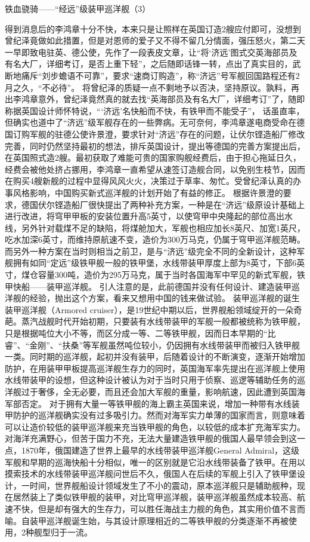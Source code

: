 \documentclass[12pt,UTF8]{ctexbook}
\begin{document}
铁血骁骑——“经远”级装甲巡洋舰（3）

得到消息后的李鸿章十分不快，本来只是让照样在英国订造2艘应付即可，没想到曾纪泽竟做如此措置，但是对恩师的爱子又不得不留几分情面，强压怒火，第二天一早即致电驻英、德公使，先作了一段表皮文章，让“将‘济远’图式交英海部员及有名大厂，详细考订，是否上重下轻”，之后随即话锋一转，点出了真实目的，武断地痛斥“刘步蟾语不可靠”，要求“速商订购造”，称“济远”号军舰回国路程还有2月之久，“不必待”。 将曾纪泽的质疑一点不剩地予以否决，坚持原议。孰料，再出李鸿章意外，曾纪泽竟然真的就去找“英海部员及有名大厂，详细考订”了，随即称据英国设计师怀特说，“‘济远’名快船而不快，有铁甲而不能受子”， 话虽直率，但确实也道中了“济远”级军舰存在的一些弊病。无可奈何，李鸿章遂电商受命在德国订购军舰的驻德公使许景澄，要求针对“济远”存在的问题，让伏尔铿造船厂修改完善，同时仍然坚持最初的想法，排斥英国设计，提出等德国的完善方案提出后，在英国照式造2艘。最初获取了难能可贵的国家购舰经费后，由于担心拖延日久，经费会被他处挤占挪用，李鸿章一直希望从速签订造舰合同，以免别生枝节，因而在购买4艘新舰的过程中显得风风火火，决策过于草率、匆忙。受曾纪泽认真的办事风格影响，中国购买新式巡洋舰的计划开始了有益的修正。
根据许景澄的要求，德国伏尔铿造船厂很快提出了两种补充方案，一种是在“济远”级原设计基础上进行改进，将穹甲甲板的安装位置升高5英寸，以使穹甲中央隆起的部位高出水线，另外针对载煤不足的缺陷，将煤舱加大，军舰也相应加长8英尺、加宽1英尺，吃水加深6英寸，而维持原航速不变，造价为300万马克，仍属于穹甲巡洋舰范畴。而另外一种方案在当时则相当之前卫，是与“济远”级完全不同的全新设计，这种军舰拥有如同“定远”级铁甲舰一般的铁甲堡，水线带装甲厚度上部为8英寸，下部6英寸，煤仓容量300吨，造价为295万马克，属于当时各国海军中罕见的新式军舰，铁甲快船——装甲巡洋舰。 引人注意的是，此前德国并没有任何设计、建造装甲巡洋舰的经验，抛出这个方案，看来又想用中国的钱来做试验。
装甲巡洋舰的诞生
装甲巡洋舰（Armored cruiser），是19世纪中期以后，世界舰船领域绽开的一朵奇葩。蒸汽战舰时代开始初期，只要装有水线带装甲的军舰一般都被统称为铁甲舰，只是根据吨位大小不等，而区分成一等、二等铁甲舰，因而日本早期的“比睿”、“金刚”、“扶桑”等军舰虽然吨位较小，仍因拥有水线带装甲而被归入铁甲舰一类。同时期的巡洋舰，起初并没有装甲，后随着设计的不断演变，逐渐开始增加防护，在用装甲甲板提高巡洋舰生存力的同时，英国海军率先提出在巡洋舰上使用水线带装甲的设想，但这种设计被认为对于当时只用于侦察、巡逻等辅助任务的巡洋舰过于奢侈，全无必要，而且还会加大军舰的重量，影响航速，因此遭到英国海军部否定。
对于拥有大量一等铁甲舰的海上霸主英国来说，增加一种带有水线装甲防护的巡洋舰确实没有过多吸引力。然而对海军实力单薄的国家而言，则意味着可以让造价较低的装甲巡洋舰来充当铁甲舰的角色，以较低的成本扩充海军实力。对海洋充满野心，但苦于国力不充，无法大量建造铁甲舰的俄国人最早领会到这一点，1870年，俄国建造了世界上最早的水线带装甲巡洋舰General Admiral，这级军舰和早期的巡海快船十分相似，唯一的区别就是它沿水线带装备了铁甲。在用以摸索技术的水线带装甲巡洋舰问世后不久，俄国人在后续的军舰上引入了铁甲堡设计，一时间，世界舰船设计领域发生了不小的震动，原本巡洋舰只是辅助舰种，现在居然装上了类似铁甲舰的装甲，对比穹甲巡洋舰，装甲巡洋舰虽然成本较高、航速不快，但是却有强大的生存力，可以胜任海战主力舰的角色，其实用价值不言而喻。自装甲巡洋舰诞生始，与其设计原理相近的二等铁甲舰的分类逐渐不再被使用，2种舰型归于一流。
\end{document}
